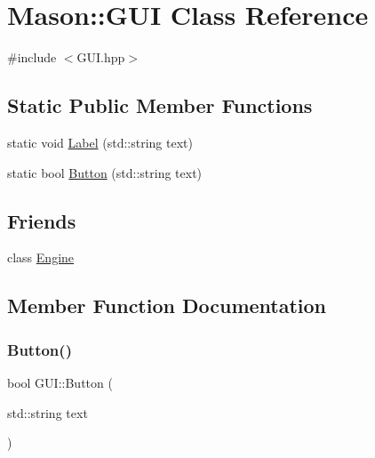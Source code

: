 \hypertarget{class_mason_1_1_g_u_i}{}\section{Mason\+:\+:G\+UI Class Reference}
\label{class_mason_1_1_g_u_i}


{\ttfamily \#include $<$G\+U\+I.\+hpp$>$}

\subsection*{Static Public Member Functions}
\begin{DoxyCompactItemize}
\item 
static void \hyperlink{class_mason_1_1_g_u_i_aa13fcc98d1df0e5446b86b4baa01ce79}{Label} (std\+::string text)
\item 
static bool \hyperlink{class_mason_1_1_g_u_i_a5d007eb87b26ce5d2d8b32082ac54b38}{Button} (std\+::string text)
\end{DoxyCompactItemize}
\subsection*{Friends}
\begin{DoxyCompactItemize}
\item 
class \hyperlink{class_mason_1_1_g_u_i_a3e1914489e4bed4f9f23cdeab34a43dc}{Engine}
\end{DoxyCompactItemize}


\subsection{Member Function Documentation}
\hypertarget{class_mason_1_1_g_u_i_a5d007eb87b26ce5d2d8b32082ac54b38}{}\label{class_mason_1_1_g_u_i_a5d007eb87b26ce5d2d8b32082ac54b38} 
\subsubsection{\texorpdfstring{Button()}{Button()}}
{\footnotesize\ttfamily bool G\+U\+I\+::\+Button (\begin{DoxyParamCaption}\item[{std\+::string}]{text }\end{DoxyParamCaption})\hspace{0.3cm}{\ttfamily [static]}}

